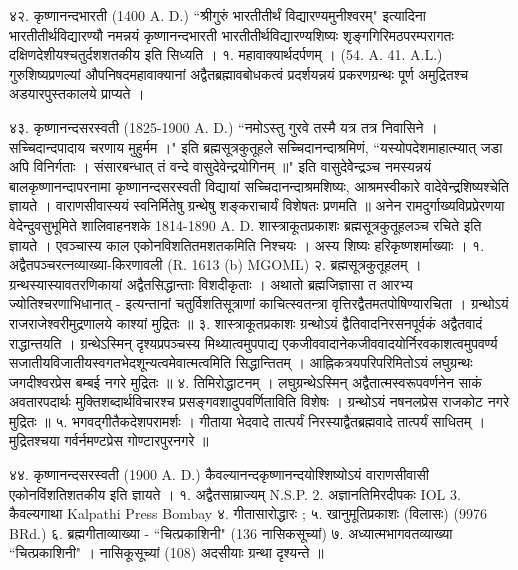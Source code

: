 ४२. कृष्णानन्दभारती (1400 A. D.)
``श्रीगुरुं भारतीतीर्थं विद्यारण्यमुनीश्वरम्" इत्यादिना भारतीतीर्थविद्यारण्यौ नमन्नयं कृष्णानन्दभारती भारतीतीर्थविद्यारण्यशिष्यः शृङ्गगिरिमठपरम्परागतः दक्षिणदेशीयश्चतुर्दशशतकीय इति सिध्यति ।
१. महावाक्यार्थदर्पणम् । (54. A. 41. A.L.)
गुरुशिष्यप्रणल्यां औपनिषदमहावाक्यानां अद्वैतब्रह्मावबोधकत्वं प्रदर्शयन्नयं प्रकरणग्रन्थः पूर्ण अमुद्रितश्च अडयारपुस्तकालये प्राप्यते ।

४३. कृष्णानन्दसरस्वती (1825-1900 A. D.)
``नमोऽस्तु गुरवे तस्मै यत्र तत्र निवासिने । सच्चिदान्दपादाय चरणाय मुहुर्मम ।" इति ब्रह्मसूत्रकुतूहले सच्चिदानन्दाश्रमिणं, ``यस्योपदेशमाहात्म्यात् जडा अपि विनिर्गताः । संसारबन्धात् तं वन्दे वासुदेवेन्द्रयोगिनम् ॥" इति वासुदेवेेन्द्रञ्च नमस्यन्नयं बालकृष्णानन्दापरनामा कृष्णानन्दसरस्वती विद्यायां सच्चिदानन्दाश्रमशिष्यः, आश्रमस्वीकारे वादेवेन्द्रशिष्यश्चेति ज्ञायते । वाराणसीवास्ययं स्वनिर्मितेषु ग्रन्थेषु शङ्कराचार्यं विशेषतः प्रणमति ॥
अनेन रामदुर्गाख्यविप्रप्रेरणया वेदेन्दुवसुभूमिते शालिवाहनशके 1814-1890 A. D. शास्त्राकूतप्रकाशः ब्रह्मसूत्रकुतूहलञ्च रचिते इति ज्ञायते । एवञ्चास्य काल एकोनविशतितमशतकमिति निश्चयः । अस्य शिष्यः हरिकृष्णशर्माख्याः ।
१. अद्वैतपञ्चरत्नव्याख्या-किरणावली (R. 1613 (b) MGOML)
२. ब्रह्मसूत्रकुतूहलम् ।
ग्रन्थस्यास्यावतरणिकायां अद्वैतसिद्धान्ताः विशदीकृताः । अथातो ब्रह्मजिज्ञासा त आरभ्य ज्योतिश्चरणाभिधानात् - इत्यन्तानां चतुर्विशतिसूत्राणां काचित्स्वतन्त्रा वृत्तिरद्वैतमतपोषिण्यारचिता । ग्रन्थोऽयं राजराजेश्वरीमुद्रणालये काश्यां मुद्रितः ॥
३. शास्त्राकूतप्रकाशः 
ग्रन्थोऽयं द्वैतिवादनिरसनपूर्वकं अद्वैतवादं राद्धान्तयति । ग्रन्थेऽस्मिन् दृश्यप्रपञ्चस्य मिथ्यात्वमुपपाद्य एकजीववादानेकजीववादयोर्निरवकाशत्वमुपवर्ण्य सजातीयविजातीयस्वगतभेदशून्यत्वमेवात्मत्वमिति सिद्धान्तितम् । आह्निकत्रयपरिपरिमितोऽयं लघुग्रन्थः जगदीश्वरप्रेस बम्बई नगरे मुद्रितः ॥
४. तिमिरोद्धाटनम् ।
लघुग्रन्थेऽस्मिन् अद्वैतात्मस्वरूपवर्णनेन साकं अवतारपदार्थः मुक्तिशब्दार्थविचारश्च प्रसङ्गवशादुपवर्णिताविति विशेषः । ग्रन्थोऽयं नषनलप्रेस राजकोट नगरे मुद्रितः ॥
५. भगवद्गीतैकदेशपरामर्शः ।
गीताया भेदवादे तात्पर्यं निरस्याद्वैतब्रह्मवादे तात्पर्यं साधितम् । मुद्रितश्चया गर्वर्नमण्टप्रेस गोण्टारपुरनगरे ॥

४४. कृष्णानन्दसरस्वती (1900 A. D.)
कैवल्यानन्दकृष्णानन्दयोश्शिष्योऽयं वाराणसीवासी एकोनविंशतिशतकीय इति ज्ञायते । १. अद्वैतसाम्राज्यम् N.S.P. 2. अज्ञानतिमिरदीपकः IOL 3. कैवल्यगाथा Kalpathi Press Bombay ४. गीतासारोद्धारः ; ५. खानुमूतिप्रकाशः (विलासः) (9976 BRd.) ६. ब्रह्मगीताव्याख्या - ``चित्प्रकाशिनी" (136 नासिकसूच्यां) ७. अध्यात्मभागवतव्याख्या ``चित्प्रकाशिनी" । नासिकूसूच्यां (108) अदसीयाः ग्रन्था दृश्यन्ते ॥

